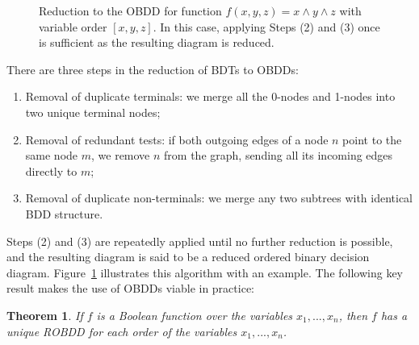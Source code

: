 \documentclass[11pt]{report}
\newtheorem{theorem}{Theorem}[section]
\begin{document}
\begin{figure}
\caption{Reduction to the OBDD for function $f(x, y, z) = x \land y \land z$ with variable order $[x, y, z]$. In this case, applying Steps (2) and (3) once is sufficient as the resulting diagram is reduced.}
\label{fig:bdd_reduction_example}
\end{figure}
\noindent There are three steps in the reduction of BDTs to OBDDs:
\begin{enumerate}
\item Removal of duplicate terminals: we merge all the 0-nodes and 1-nodes into two unique terminal nodes;
\item Removal of redundant tests: if both outgoing edges of a node $n$ point to the same node $m$, we remove $n$ from the graph, sending all its incoming edges directly to $m$;
\item Removal of duplicate non-terminals: we merge any two subtrees with identical BDD structure.
\end{enumerate}
Steps (2) and (3) are repeatedly applied until no further reduction is possible, and the resulting diagram is said to be a reduced ordered binary decision diagram. Figure~\ref{fig:bdd_reduction_example} illustrates this algorithm with an example.
The following key result makes the use of OBDDs viable in practice: 

\begin{theorem} \cite{bryant}
\label{obdd_uniqueness}
If $f$ is a Boolean function over the variables $x_1, ..., x_n$, then $f$ has a unique ROBDD for each order of the variables $x_1, ..., x_n$.
\end{theorem}
\end{document}

